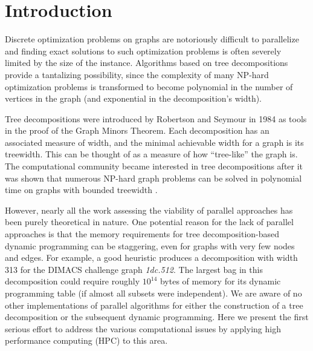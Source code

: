 \documentclass[conference]{IEEEtran}
\begin{document}
\section{Introduction}

Discrete optimization problems on graphs are
notoriously difficult to parallelize and finding exact solutions to
such optimization problems is often severely limited by the size of the instance.  Algorithms
based on tree decompositions provide a tantalizing possibility, since
the complexity of many NP-hard optimization problems
is transformed to become polynomial in the number of vertices in the
graph (and exponential in the decomposition's width). 

Tree decompositions were introduced by Robertson and Seymour in 1984
\cite{RobertsonSeymour1984} as tools in the proof of the Graph Minors Theorem.
Each decomposition has an associated measure of width, and the minimal achievable width
for a graph is its treewidth. This can be thought of as a measure of how ``tree-like'' the graph is.
The computational community became interested in tree decompositions after it was
shown that numerous NP-hard graph problems can be solved in polynomial time
on graphs with bounded treewidth \cite{Courcelle1990Rewriting}.

However, nearly all the work assessing the viability of parallel approaches has been
purely theoretical in nature.
One potential reason for the lack of parallel approaches is that
the memory requirements for tree decomposition-based
dynamic programming can be staggering, even for graphs with very few nodes and edges.
For example, a good heuristic produces a decomposition with width 313 for the
DIMACS challenge graph \emph{1dc.512}. \cite{DIMACS}  The largest bag in this decomposition could
require roughly $10^{14}$ bytes of memory for its dynamic programming table (if almost all subsets were independent).
We are aware of no other implementations of parallel algorithms for either the construction of a tree decomposition or the
subsequent dynamic programming.  
Here we present the first
serious effort to address the various computational issues by
applying high performance computing (HPC) to this area.
\end{document}
